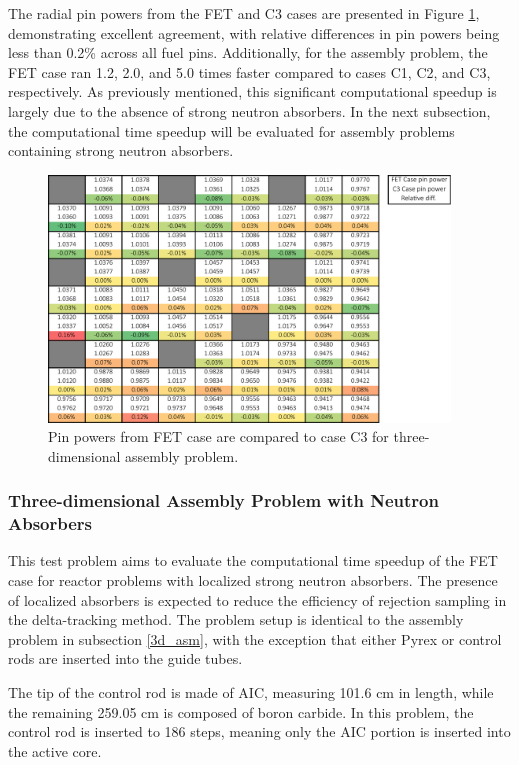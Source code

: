 The radial pin powers from the FET and C3 cases are presented in Figure \ref{fig_47}, demonstrating excellent agreement, with relative differences in pin powers being less than 0.2\% across all fuel pins. Additionally, for the assembly problem, the FET case ran 1.2, 2.0, and 5.0 times faster compared to cases C1, C2, and C3, respectively. As previously mentioned, this significant computational speedup is largely due to the absence of strong neutron absorbers. In the next subsection, the computational time speedup will be evaluated for assembly problems containing strong neutron absorbers.

\begin{figure}
    \centering
    \includegraphics[width=0.95\textwidth]{figs/pin_powers.pdf}
    \caption[Pin powers comparisons for three-dimensional assembly problem.]{Pin powers from FET case are compared to case C3 for three-dimensional assembly problem.}
    \label{fig_47}
\end{figure}

\subsubsection{Three-dimensional Assembly Problem with Neutron Absorbers}

This test problem aims to evaluate the computational time speedup of the FET case for reactor problems with localized strong neutron absorbers. The presence of localized absorbers is expected to reduce the efficiency of rejection sampling in the delta-tracking method. The problem setup is identical to the assembly problem in subsection \ref{3d_asm}, with the exception that either Pyrex or control rods are inserted into the guide tubes.

The tip of the control rod is made of AIC, measuring 101.6 cm in length, while the remaining 259.05 cm is composed of boron carbide. In this problem, the control rod is inserted to 186 steps, meaning only the AIC portion is inserted into the active core.

